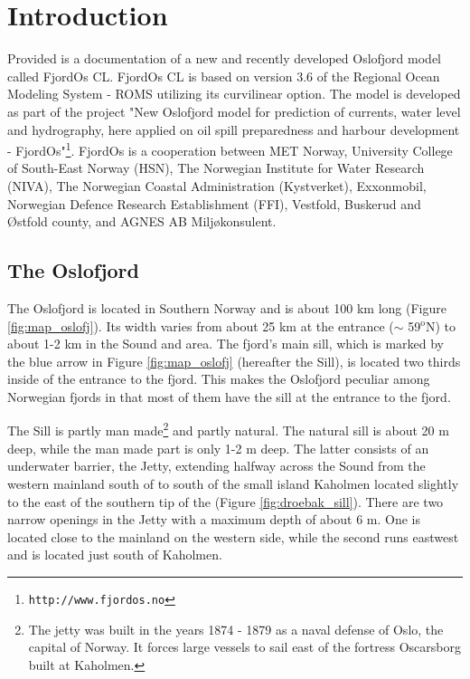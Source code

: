 \section{Introduction}
\label{sec:intro}
Provided is a documentation of a new and recently developed Oslofjord model called FjordOs CL. FjordOs CL is based on version 3.6 of the Regional Ocean Modeling System - ROMS \citep{haidv:etal:2008, shche:mcwil:2005, shche:mcwil:2009} utilizing its curvilinear option. The model is developed as part of the project "New Oslofjord model for prediction of currents, water level and hydrography, here applied on oil spill preparedness and harbour development - FjordOs"\footnote{\texttt{http://www.fjordos.no}}. FjordOs is a cooperation between MET Norway, University College of  South-East Norway (HSN), The Norwegian Institute for Water Research (NIVA), The Norwegian Coastal Administration
(Kystverket), Exxonmobil, Norwegian Defence Research Establishment (FFI), Vestfold, Buskerud and {\O}stfold county, and AGNES AB Milj{\o}konsulent.

\subsection{The Oslofjord}
\label{subsec:oslofjord}
The Oslofjord is located in Southern Norway and is about 100 km long (Figure \ref{fig:map_oslofj}). Its width varies from about 25 km at the entrance ($\sim$ 59$^\text{o}$N) to about 1-2 km in the {\DR} Sound and {\DR} area. The fjord's main sill, which is marked by the blue arrow in Figure \ref{fig:map_oslofj} (hereafter the {\DR} Sill), is located two thirds inside of the entrance to the fjord. This makes the Oslofjord peculiar among Norwegian fjords in that most of them have the sill at the entrance to the fjord. 


The {\DR} Sill is partly man made\footnote{The jetty was built in the years 1874 - 1879 as a naval defense of Oslo, the capital of Norway. It forces large vessels to sail east of the fortress Oscarsborg built at Kaholmen.} and partly natural. The natural sill is about 20 m deep, while the man made part is only 1-2 m deep. The latter consists of an underwater barrier, the {\DR} Jetty, extending halfway across the {\DR} Sound from the western mainland south of {\DR} to south of the small island Kaholmen located slightly to the east of the southern tip of the {\HAA} (Figure \ref{fig:droebak_sill}). There are two narrow openings in the Jetty with a maximum depth of about 6 m. One is located close to the mainland on the western side, while the second runs eastwest and is located just south of Kaholmen.   
 


